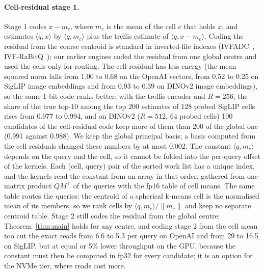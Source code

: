 \documentclass[fleqn,10pt]{wlscirep}
\begin{document}
\paragraph{Cell-residual stage 1.} Stage 1 codes $x-m_c$, where $m_c$ is the mean of the cell $c$ that holds $x$, and estimates $\langle q,x\rangle$ by $\langle q,m_c\rangle$ plus the trellis estimate of $\langle q,x-m_c\rangle$. Coding the residual from the coarse centroid is standard in inverted-file indexes (IVFADC~\cite{jegou2011pq}, IVF-RaBitQ~\cite{shi2026ivfrabitq}); our earlier engines coded the residual from one global centre and used the cells only for routing. The cell residual has less energy (the mean squared norm falls from 1.00 to 0.68 on the OpenAI vectors, from 0.52 to 0.25 on SigLIP image embeddings and from 0.93 to 0.39 on DINOv2 image embeddings), so the same 1-bit code ranks better: with the trellis encoder and $R=256$, the share of the true top-10 among the top 200 estimates of 128 probed SigLIP cells rises from 0.977 to 0.994, and on DINOv2 ($R=512$, 64 probed cells) 100 candidates of the cell-residual code keep more of them than 200 of the global one (0.991 against 0.988). We keep the global principal basis; a basis computed from the cell residuals changed these numbers by at most 0.002. The constant $\langle q,m_c\rangle$ depends on the query and the cell, so it cannot be folded into the per-query offset of the kernels. Each (cell, query) pair of the sorted work list has a unique index, and the kernels read the constant from an array in that order, gathered from one matrix product $QM^\top$ of the queries with the fp16 table of cell means. The same table routes the queries: the centroid of a spherical k-means cell is the normalised mean of its members, so we rank cells by $\langle q,m_c\rangle/\|m_c\|$ and keep no separate centroid table. Stage 2 still codes the residual from the global centre: Theorem~\ref{thm:main} holds for any centre, and coding stage 2 from the cell mean too cut the exact reads from 6.6 to 5.3 per query on OpenAI and from 29 to 16.5 on SigLIP, but at equal or 5\% lower throughput on the GPU, because the constant must then be computed in fp32 for every candidate; it is an option for the NVMe tier, where reads cost more.
\end{document}
